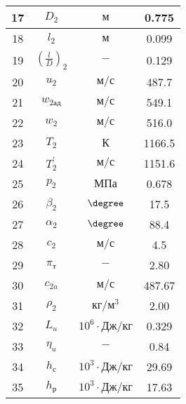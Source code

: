 \begin{center}
\begin{longtable}{|c|c|c|c|}
        17 & $D_2$ & $м$ & 0.775 \\\hline
        
        18 & $l_2$ & $м$ & 0.099 \\\hline
        
        19 & $\left( \frac{l}{D} \right)_2$ & $-$ & 0.129 \\\hline
        
        20 & $u_2$ & $м/с$ & 487.7 \\\hline
        
        21 & $w_{2ад}$ & $м/с$ & 549.1 \\\hline
        
        22 & $w_2$ & $м/с$ & 516.0 \\\hline
        
        23 & $T_2$ & $К$ & 1166.5 \\\hline
        
        24 & $T_2^\prime$ & $м/с$ & 1151.6 \\\hline
        
        25 & $p_2$ & $МПа$ & 0.678 \\\hline
        
        26 & $\beta_2$ & $\degree$ & 17.5 \\\hline
        
        27 & $\alpha_2$ & $\degree$ & 88.4 \\\hline
        
        28 & $c_2$ & $м/с$ & 4.5 \\\hline
        
        29 & $\pi_т$ & $-$ & 2.80 \\\hline
        
        30 & $c_{2a}$ & $м/с$ & 487.67 \\\hline
        
        31 & $\rho_2$ & $кг/м^3$ & 2.00 \\\hline
        
        32 & $L_u$ & $10^6 \cdot Дж/кг$ & 0.329 \\\hline
        
        33 & $\eta_u$ & $-$ & 0.84 \\\hline
        
        34 & $h_с$ & $10^3 \cdot Дж/кг$ & 29.69 \\\hline
        
        35 & $h_р$ & $10^3 \cdot Дж/кг$ & 17.63 \\\hline
        

\end{longtable}
\end{center}
